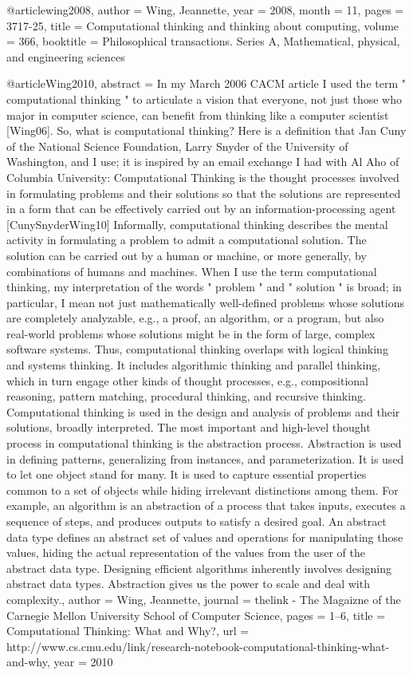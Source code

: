 @article{wing2008,
	author = {Wing, Jeannette},
	year = {2008},
	month = {11},
	pages = {3717-25},
	title = {Computational thinking and thinking about computing},
	volume = {366},
	booktitle = {Philosophical transactions. Series A, Mathematical, physical, and engineering sciences}
}



@article{Wing2010,
	abstract = {In my March 2006 CACM article I used the term " computational thinking " to articulate a vision that everyone, not just those who major in computer science, can benefit from thinking like a computer scientist [Wing06]. So, what is computational thinking? Here is a definition that Jan Cuny of the National Science Foundation, Larry Snyder of the University of Washington, and I use; it is inspired by an email exchange I had with Al Aho of Columbia University: Computational Thinking is the thought processes involved in formulating problems and their solutions so that the solutions are represented in a form that can be effectively carried out by an information-processing agent [CunySnyderWing10] Informally, computational thinking describes the mental activity in formulating a problem to admit a computational solution. The solution can be carried out by a human or machine, or more generally, by combinations of humans and machines. When I use the term computational thinking, my interpretation of the words " problem " and " solution " is broad; in particular, I mean not just mathematically well-defined problems whose solutions are completely analyzable, e.g., a proof, an algorithm, or a program, but also real-world problems whose solutions might be in the form of large, complex software systems. Thus, computational thinking overlaps with logical thinking and systems thinking. It includes algorithmic thinking and parallel thinking, which in turn engage other kinds of thought processes, e.g., compositional reasoning, pattern matching, procedural thinking, and recursive thinking. Computational thinking is used in the design and analysis of problems and their solutions, broadly interpreted. The most important and high-level thought process in computational thinking is the abstraction process. Abstraction is used in defining patterns, generalizing from instances, and parameterization. It is used to let one object stand for many. It is used to capture essential properties common to a set of objects while hiding irrelevant distinctions among them. For example, an algorithm is an abstraction of a process that takes inputs, executes a sequence of steps, and produces outputs to satisfy a desired goal. An abstract data type defines an abstract set of values and operations for manipulating those values, hiding the actual representation of the values from the user of the abstract data type. Designing efficient algorithms inherently involves designing abstract data types. Abstraction gives us the power to scale and deal with complexity.},
	author = {Wing, Jeannette},
	journal = {thelink - The Magaizne of the Carnegie Mellon University School of Computer Science},
	pages = {1--6},
	title = {{Computational Thinking: What and Why?}},
	url = {http://www.cs.cmu.edu/link/research-notebook-computational-thinking-what-and-why},
	year = {2010}
}


